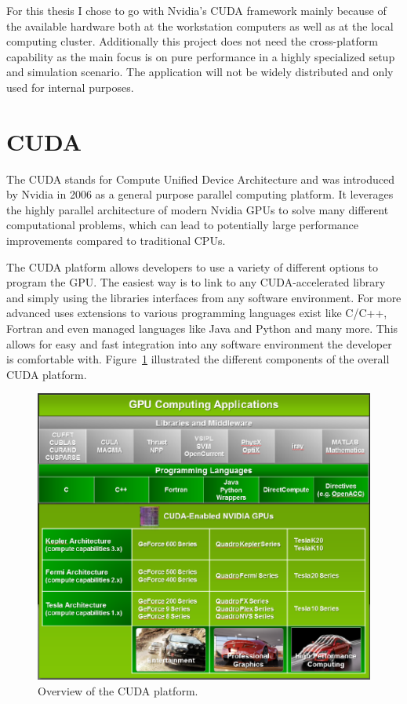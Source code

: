 \documentclass[a4paper,11pt]{kth-mag}
\begin{document}
For this thesis I chose to go with Nvidia's CUDA framework mainly because of the available hardware both at the workstation computers as well as at the local computing cluster. Additionally this project does not need the cross-platform capability as the main focus is on pure performance in a highly specialized setup and simulation scenario. The application will not be widely distributed and only used for internal purposes.

\section{CUDA}
\label{sec:CUDA}
The CUDA stands for Compute Unified Device Architecture and was introduced by Nvidia in 2006 as a general purpose parallel computing platform. It leverages the highly parallel architecture of modern Nvidia GPUs to solve many different computational problems, which can lead to potentially large performance improvements compared to traditional CPUs.

The CUDA platform allows developers to use a variety of different options to program the GPU. The easiest way is to link to any CUDA-accelerated library and simply using the libraries interfaces from any software environment. For more advanced uses extensions to various programming languages exist like C/C++, Fortran and even managed languages like Java and Python and many more. This allows for easy and fast integration into any software environment the developer is comfortable with. Figure~\ref{fig:cuda_overview} illustrated the different components of the overall CUDA platform.

\begin{figure}[!htbp]
  \centering
  \includegraphics[width=\textwidth]{img/cuda_overview.pdf}
  \caption{Overview of the CUDA platform.}
  \label{fig:cuda_overview}
\end{figure}
\end{document}
